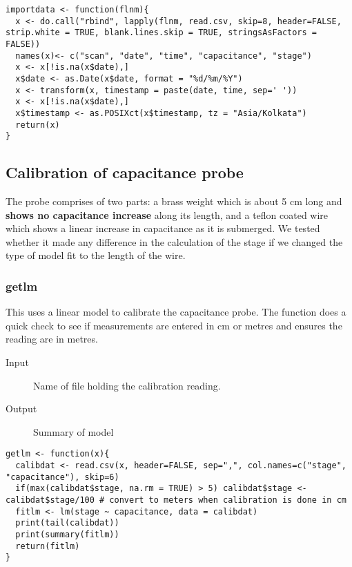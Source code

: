 \documentclass[a4paper]{article}
\begin{document}
\begin{verbatim}
importdata <- function(flnm){
  x <- do.call("rbind", lapply(flnm, read.csv, skip=8, header=FALSE, strip.white = TRUE, blank.lines.skip = TRUE, stringsAsFactors = FALSE))
  names(x)<- c("scan", "date", "time", "capacitance", "stage")
  x <- x[!is.na(x$date),]
  x$date <- as.Date(x$date, format = "%d/%m/%Y") 
  x <- transform(x, timestamp = paste(date, time, sep=' '))
  x <- x[!is.na(x$date),]
  x$timestamp <- as.POSIXct(x$timestamp, tz = "Asia/Kolkata")
  return(x)
}
\end{verbatim}

\subsection*{Calibration of capacitance probe}
\label{sec:org27a369a}

The probe comprises of two parts: a brass weight which is about 5 cm long and  \textbf{shows no capacitance increase} along its length, and a teflon coated wire which shows a linear increase in capacitance as it is submerged. We tested whether it made any difference in the calculation of the stage if we changed the type of model fit to the length of the wire. 

\subsubsection*{getlm}
\label{sec:org231635d}

This uses a linear model to calibrate the capacitance probe. The function does a quick check to see if measurements are entered in cm or metres and ensures the reading are in metres.

\begin{description}
\item[{Input}] Name of file holding the calibration reading.
\item[{Output}] Summary of model
\end{description}

\begin{verbatim}
getlm <- function(x){
  calibdat <- read.csv(x, header=FALSE, sep=",", col.names=c("stage", "capacitance"), skip=6)
  if(max(calibdat$stage, na.rm = TRUE) > 5) calibdat$stage <- calibdat$stage/100 # convert to meters when calibration is done in cm
  fitlm <- lm(stage ~ capacitance, data = calibdat)
  print(tail(calibdat))
  print(summary(fitlm))
  return(fitlm) 
}
\end{verbatim}
\end{document}
